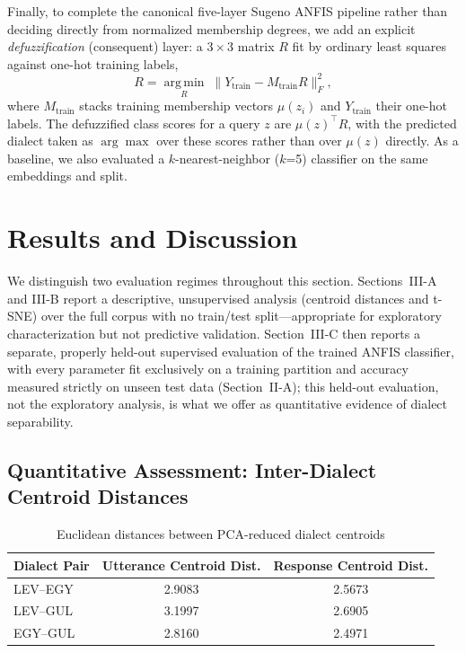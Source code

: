 \documentclass[conference]{IEEEtran}
\begin{document}
Finally, to complete the canonical five-layer Sugeno ANFIS pipeline rather than deciding directly from normalized membership degrees, we add an explicit \emph{defuzzification} (consequent) layer: a $3\times3$ matrix $R$ fit by ordinary least squares against one-hot training labels,
\begin{equation}
R = \operatorname*{arg\,min}_{R} \; \lVert Y_{\text{train}} - M_{\text{train}} R \rVert_F^2,
\label{eq:defuzz}
\end{equation}
where $M_{\text{train}}$ stacks training membership vectors $\mu(z_i)$ and $Y_{\text{train}}$ their one-hot labels. The defuzzified class scores for a query $z$ are $\mu(z)^\top R$, with the predicted dialect taken as $\arg\max$ over these scores rather than over $\mu(z)$ directly. As a baseline, we also evaluated a $k$-nearest-neighbor ($k$=5) classifier on the same embeddings and split.

\section{Results and Discussion}
We distinguish two evaluation regimes throughout this section. Sections~III-A and III-B report a descriptive, unsupervised analysis (centroid distances and t-SNE) over the full corpus with no train/test split---appropriate for exploratory characterization but not predictive validation. Section~III-C then reports a separate, properly held-out supervised evaluation of the trained ANFIS classifier, with every parameter fit exclusively on a training partition and accuracy measured strictly on unseen test data (Section~II-A); this held-out evaluation, not the exploratory analysis, is what we offer as quantitative evidence of dialect separability.

\subsection{Quantitative Assessment: Inter-Dialect Centroid Distances}

\begin{table}[t]
\centering
\caption{Euclidean distances between PCA-reduced dialect centroids}
\label{tab:centroids}
\begin{tabular}{lcc}
\toprule
Dialect Pair & Utterance Centroid Dist. & Response Centroid Dist. \\
\midrule
LEV--EGY & 2.9083 & 2.5673 \\
LEV--GUL & 3.1997 & 2.6905 \\
EGY--GUL & 2.8160 & 2.4971 \\
\bottomrule
\end{tabular}
\end{table}
\end{document}
